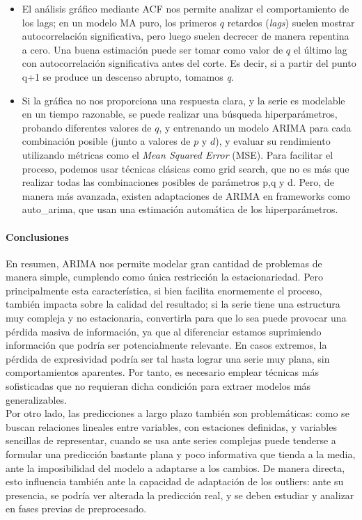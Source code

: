 	\begin{itemize}
		\item El análisis gráfico mediante ACF nos permite analizar el comportamiento de los lags; en un modelo MA puro, los primeros \( q \) retardos (\textit{lags}) suelen mostrar autocorrelación significativa, pero luego suelen decrecer de manera repentina a cero. Una buena estimación puede ser tomar como valor de \( q \)  el último lag con autocorrelación significativa antes del corte. Es decir, si a partir del punto q+1 se produce un descenso abrupto, tomamos \textit{q}.
		
		\item Si la gráfica no nos proporciona una respuesta clara, y la serie es modelable en un tiempo razonable, se puede realizar una búsqueda hiperparámetros, probando diferentes valores de \( q \), y entrenando un modelo ARIMA para cada combinación posible (junto a valores de \( p \) y \( d \)), y evaluar su rendimiento utilizando métricas como el \textit{Mean Squared Error} (MSE). Para facilitar el proceso, podemos usar técnicas clásicas como grid search, que no es más que realizar todas las combinaciones posibles de parámetros p,q y d. Pero, de manera más avanzada, existen adaptaciones de ARIMA en frameworks como auto\_arima,  que usan una estimación automática de los hiperparámetros.
	\end{itemize}
	

\paragraph{Conclusiones}
\mbox{}

En resumen, ARIMA nos permite modelar gran cantidad de problemas de manera simple, cumplendo como única restricción la estacionariedad. Pero principalmente esta característica, si bien facilita enormemente el proceso, también impacta sobre la calidad del resultado; si la serie tiene una estructura muy compleja y no estacionaria, convertirla para que lo sea puede provocar una pérdida masiva de información, ya que al diferenciar estamos suprimiendo información que podría ser potencialmente relevante. En casos extremos, la pérdida de expresividad podría ser tal hasta lograr una serie muy plana, sin comportamientos aparentes. Por tanto, es necesario emplear técnicas más sofisticadas que no requieran dicha condición para extraer modelos más generalizables.\\

Por otro lado, las predicciones a largo plazo también son problemáticas: como se buscan relaciones lineales entre variables, con estaciones definidas, y variables sencillas de representar, cuando se usa ante series complejas puede tenderse a formular una predicción bastante plana y poco informativa que tienda a la media, ante la imposibilidad del modelo a adaptarse a los cambios. De manera directa, esto influencia también ante la capacidad de adaptación de los outliers: ante su presencia, se podría ver alterada la predicción real, y se deben estudiar y analizar en fases previas de preprocesado.\\


